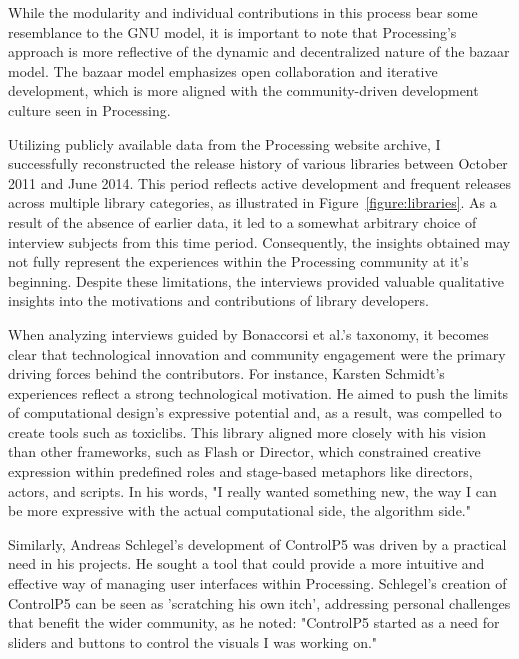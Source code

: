 While the modularity and individual contributions in this process bear some resemblance to the GNU model, it is important to note that Processing's approach is more reflective of the dynamic and decentralized nature of the bazaar model. The bazaar model emphasizes open collaboration and iterative development, which is more aligned with the community-driven development culture seen in Processing.

Utilizing publicly available data from the Processing website archive, I successfully reconstructed the release history of various libraries between October 2011 and June 2014. This period reflects active development and frequent releases across multiple library categories, as illustrated in Figure~\ref*{figure:libraries}. As a result of the absence of earlier data, it led to a somewhat arbitrary choice of interview subjects from this time period. Consequently, the insights obtained may not fully represent the experiences within the Processing community at it's beginning. Despite these limitations, the interviews provided valuable qualitative insights into the motivations and contributions of library developers. 




When analyzing interviews guided by Bonaccorsi et al.'s taxonomy, it becomes clear that technological innovation and community engagement were the primary driving forces behind the contributors. For instance, Karsten Schmidt's experiences reflect a strong technological motivation. He aimed to push the limits of computational design's expressive potential and, as a result, was compelled to create tools such as toxiclibs. This library aligned more closely with his vision than other frameworks, such as Flash or Director, which constrained creative expression within predefined roles and stage-based metaphors like directors, actors, and scripts. In his words, "I really wanted something new, the way I can be more expressive with the actual computational side, the algorithm side."

Similarly, Andreas Schlegel's development of ControlP5 was driven by a practical need in his projects. He sought a tool that could provide a more intuitive and effective way of managing user interfaces within Processing. Schlegel's creation of ControlP5 can be seen as 'scratching his own itch', addressing personal challenges that benefit the wider community, as he noted: "ControlP5 started as a need for sliders and buttons to control the visuals I was working on."


